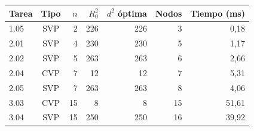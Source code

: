 \begin{tabular}{@{}lcrrrrr@{}}
\toprule
Tarea & Tipo & $n$ & $R_0^2$ & $d^2$ óptima & Nodos & Tiempo (ms)\\
\midrule
1.05 & SVP & 2 & 226 & 226 & 3 & 0{,}18 \\
2.01 & SVP & 4 & 230 & 230 & 5 & 1{,}17 \\
2.02 & SVP & 5 & 263 & 263 & 6 & 2{,}66 \\
2.04 & CVP & 7 & 12 & 12 & 7 & 5{,}31 \\
2.05 & SVP & 7 & 263 & 263 & 8 & 4{,}06 \\
3.03 & CVP & 15 & 8 & 8 & 15 & 51{,}61 \\
3.04 & SVP & 15 & 250 & 250 & 16 & 39{,}92 \\
\bottomrule
\end{tabular}
